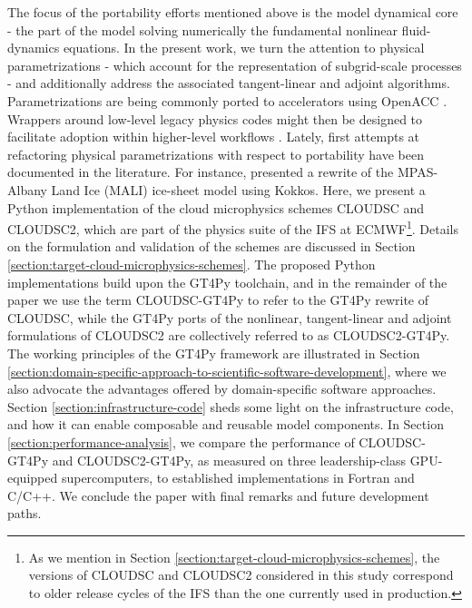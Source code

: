 \documentclass[main.tex]{subfiles}
\begin{document}
        The focus of the portability efforts mentioned above is the model dynamical core - the part of the model solving numerically the fundamental nonlinear fluid-dynamics equations. In the present work, we turn the attention to physical parametrizations - which account for the representation of subgrid-scale processes - and additionally address the associated tangent-linear and adjoint algorithms. Parametrizations are being commonly ported to accelerators using OpenACC \citep[e.g., ][]{fuhrer14, yang19, kim21}. Wrappers around low-level legacy physics codes might then be designed to facilitate adoption within higher-level workflows \citep{monteiro18, mcgibbon21}. Lately, first attempts at refactoring physical parametrizations with respect to portability have been documented in the literature. For instance, \citet{watkins23} presented a rewrite of the MPAS-Albany Land Ice (MALI) ice-sheet model using Kokkos. Here, we present a Python implementation of the cloud microphysics schemes CLOUDSC and CLOUDSC2, which are part of the physics suite of the IFS at ECMWF\footnote{As we mention in Section \ref{section:target-cloud-microphysics-schemes}, the versions of CLOUDSC and CLOUDSC2 considered in this study correspond to older release cycles of the IFS than the one currently used in production.}. Details on the formulation and validation of the schemes are discussed in Section \ref{section:target-cloud-microphysics-schemes}. The proposed Python implementations build upon the GT4Py toolchain, and in the remainder of the paper we use the term CLOUDSC-GT4Py to refer to the GT4Py rewrite of CLOUDSC, while the GT4Py ports of the nonlinear, tangent-linear and adjoint formulations of CLOUDSC2 are collectively referred to as CLOUDSC2-GT4Py. The working principles of the GT4Py framework are illustrated in Section \ref{section:domain-specific-approach-to-scientific-software-development}, where we also advocate the advantages offered by domain-specific software approaches. Section \ref{section:infrastructure-code} sheds some light on the infrastructure code, and how it can enable composable and reusable model components. In Section \ref{section:performance-analysis}, we compare the performance of CLOUDSC-GT4Py and CLOUDSC2-GT4Py, as measured on three leadership-class GPU-equipped supercomputers, to established implementations in Fortran and C/C++. We conclude the paper with final remarks and future development paths.

    \biblio
\end{document}
